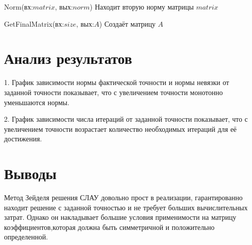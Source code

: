 \documentclass{article}
\begin{document}
	Norm(вх:$matrix$, вых:$norm$) Находит вторую норму матрицы $matrix$
	
	GetFinalMatrix(вх:$size$, вых:$A$) Создаёт матрицу $A$

	\section{Анализ результатов}
		1. График зависимости нормы фактической точности и нормы невязки от заданной точности показывает, что с увеличением точности монотонно уменьшаются нормы.
		
		2. График зависимости числа итераций от заданной точности показывает, что с увеличением точности возрастает количество необходимых итераций для её достижения.


	\section{Выводы}
		Метод Зейделя решения СЛАУ довольно прост в реализации, гарантированно находит решение с заданной точностью и не требует больших вычислительных затрат. Однако он накладывает большие условия применимости на матрицу коэффициентов,которая должна быть симметричной и положительно определенной.
	
\end{document}

